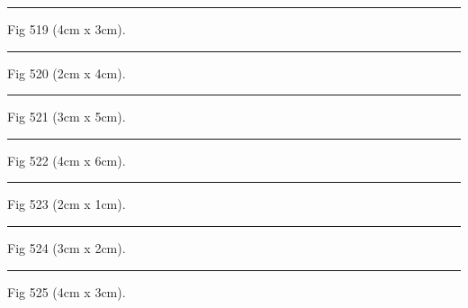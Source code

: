 \documentclass[a4paper,11pt]{article}
\begin{document}
\begin{swarmwrap}%
  \begin{minipage}[t]{4cm}
    \centering
    \rule{\linewidth}{3cm}
    {\footnotesize Fig 519 (4cm x 3cm).}
  \end{minipage}%
\end{swarmwrap}%
\swarmwrapnext
\lipsum[69]%

\begin{swarmwrap}%
  \begin{minipage}[t]{2cm}
    \centering
    \rule{\linewidth}{4cm}
    {\footnotesize Fig 520 (2cm x 4cm).}
  \end{minipage}%
\end{swarmwrap}%
\swarmwrapnext
\lipsum[70]%

\begin{swarmwrap}%
  \begin{minipage}[t]{3cm}
    \centering
    \rule{\linewidth}{5cm}
    {\footnotesize Fig 521 (3cm x 5cm).}
  \end{minipage}%
\end{swarmwrap}%
\swarmwrapnext
\lipsum[71]%

\begin{swarmwrap}%
  \begin{minipage}[t]{4cm}
    \centering
    \rule{\linewidth}{6cm}
    {\footnotesize Fig 522 (4cm x 6cm).}
  \end{minipage}%
\end{swarmwrap}%
\swarmwrapnext
\lipsum[72]%

\begin{swarmwrap}%
  \begin{minipage}[t]{2cm}
    \centering
    \rule{\linewidth}{1cm}
    {\footnotesize Fig 523 (2cm x 1cm).}
  \end{minipage}%
\end{swarmwrap}%
\swarmwrapnext
\lipsum[73]%

\begin{swarmwrap}%
  \begin{minipage}[t]{3cm}
    \centering
    \rule{\linewidth}{2cm}
    {\footnotesize Fig 524 (3cm x 2cm).}
  \end{minipage}%
\end{swarmwrap}%
\swarmwrapnext
\lipsum[74]%

\begin{swarmwrap}%
  \begin{minipage}[t]{4cm}
    \centering
    \rule{\linewidth}{3cm}
    {\footnotesize Fig 525 (4cm x 3cm).}
  \end{minipage}%
\end{swarmwrap}%
\swarmwrapnext
\lipsum[75]%
\end{document}
